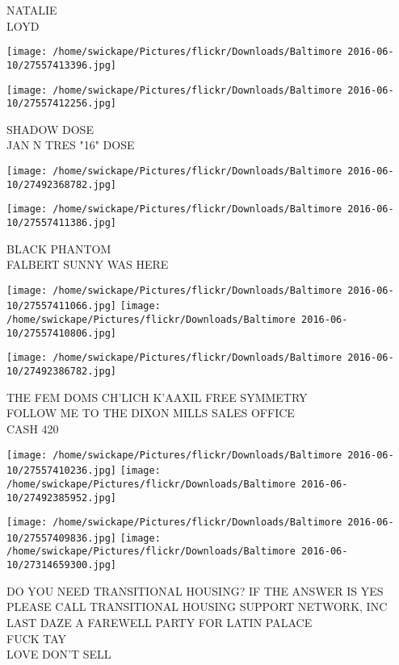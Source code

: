 \documentclass[10pt,letterpaper]{article}
\begin{document}
NATALIE\\
LOYD\\
\pagebreak

\texttt{[image: /home/swickape/Pictures/flickr/Downloads/Baltimore 2016-06-10/27557413396.jpg]}

\vspace{0.25in}
\texttt{[image: /home/swickape/Pictures/flickr/Downloads/Baltimore 2016-06-10/27557412256.jpg]}

SHADOW DOSE\\
JAN N TRES "16" DOSE\\
\pagebreak

\texttt{[image: /home/swickape/Pictures/flickr/Downloads/Baltimore 2016-06-10/27492368782.jpg]}

\vspace{0.25in}
\texttt{[image: /home/swickape/Pictures/flickr/Downloads/Baltimore 2016-06-10/27557411386.jpg]}

BLACK PHANTOM\\
FALBERT SUNNY WAS HERE\\
\pagebreak

\texttt{[image: /home/swickape/Pictures/flickr/Downloads/Baltimore 2016-06-10/27557411066.jpg]}
\texttt{[image: /home/swickape/Pictures/flickr/Downloads/Baltimore 2016-06-10/27557410806.jpg]}

\vspace{0.25in}
\texttt{[image: /home/swickape/Pictures/flickr/Downloads/Baltimore 2016-06-10/27492386782.jpg]}

THE FEM DOMS CH'LICH K'AAXIL FREE SYMMETRY\\
FOLLOW ME TO THE DIXON MILLS SALES OFFICE\\
CASH 420\\
\pagebreak

\texttt{[image: /home/swickape/Pictures/flickr/Downloads/Baltimore 2016-06-10/27557410236.jpg]}
\texttt{[image: /home/swickape/Pictures/flickr/Downloads/Baltimore 2016-06-10/27492385952.jpg]}

\texttt{[image: /home/swickape/Pictures/flickr/Downloads/Baltimore 2016-06-10/27557409836.jpg]}
\texttt{[image: /home/swickape/Pictures/flickr/Downloads/Baltimore 2016-06-10/27314659300.jpg]}

DO YOU NEED TRANSITIONAL HOUSING?  IF THE ANSWER IS YES PLEASE CALL TRANSITIONAL HOUSING SUPPORT NETWORK, INC\\
LAST DAZE A FAREWELL PARTY FOR LATIN PALACE\\
FUCK TAY\\
LOVE DON'T SELL\\
\pagebreak
\end{document}
